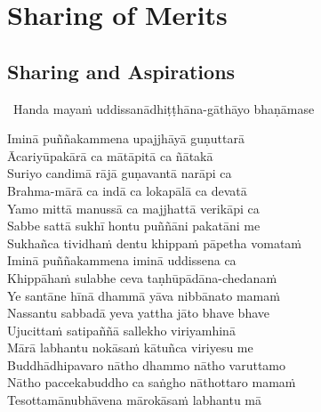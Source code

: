 
\chapter{Sharing of Merits}

\begingroup
\setsechook{%
  \clearpage%
  \setsecnumformat{}%
}

\setsecheadstyle{\sectionFmt}

\section{Sharing and Aspirations}
\label{uddissanadhitthana}

\begin{leader}
  \anglebracketleft\ \hspace{-0.5mm}Handa mayaṁ uddissanādhiṭṭhāna-gāthāyo bhaṇāmase \hspace{-0.5mm}\anglebracketright\
\end{leader}

Iminā puññakammena upajjhāyā guṇuttarā\\
Ācariyūpakārā ca mātāpitā ca ñātakā\\
Suriyo candimā rājā guṇavantā narāpi ca\\
Brahma-mārā ca indā ca lokapālā ca devatā\\
Yamo mittā manussā ca majjhattā verikāpi ca\\
Sabbe sattā sukhī hontu puññāni pakatāni me\\
Sukhañca tividhaṁ dentu khippaṁ pāpetha vomataṁ\\
Iminā puññakammena iminā uddissena ca\\
Khippāhaṁ sulabhe ceva taṇhūpādāna-chedanaṁ\\
Ye santāne hīnā dhammā yāva nibbānato mamaṁ\\
Nassantu sabbadā yeva yattha jāto bhave bhave\\
Ujucittaṁ satipaññā sallekho viriyamhinā\\
Mārā labhantu nokāsaṁ kātuñca viriyesu me\\
Buddhādhipavaro nātho dhammo nātho varuttamo\\
Nātho paccekabuddho ca saṅgho nāthottaro mamaṁ\\
Tesottamānubhāvena mārokāsaṁ labhantu mā


